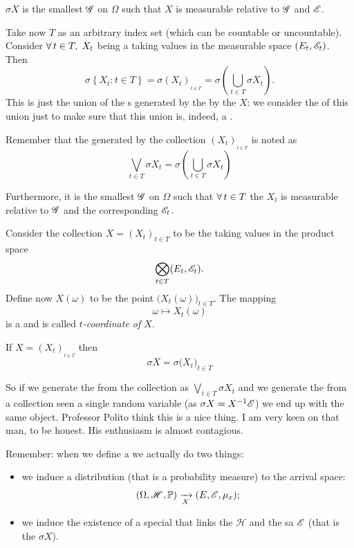 \documentclass{report}
\begin{document}
\begin{remark}
	$\sigma X$ is the smallest \sa{} $\mathscr{G}$ on $\Omega$ such that $X$ is measurable relative to $\mathscr{G}$ and $\mathscr{E}$.
\end{remark}
Take now $T$ as an arbitrary index set (which can be countable or uncountable). Consider $\forall\, t\in T,\;X_t$ being a \rv{} taking values in the measurable space $(E_t,\mathscr{E}_t)$. Then
\[
\sigma\left\{X_t:t\in T\right\}=\sigma(X_t)_{_{t\in T}}=\sigma\left(\bigcup_{t\in T}\sigma X_t\right).
\]
This is just the union of the \sa s generated by the by the \rv{} $X$: we consider the \sa{} of this union just to make sure that this union is, indeed, a \sa{}.\par
\begin{notation}
	Remember that the \sa{} generated by the collection $(X_t)_{_{t\in T}}$ is noted as
		\[\bigvee_{t\in T}\sigma X_t=\sigma\left(\bigcup_{t\in T}\sigma X_t\right)\]
\end{notation}
Furthermore, it is the smallest \sa{} $\mathscr{G}$ on $\Omega$ such that $\forall\, t\in T$ the \rv{} $X_t$ is measurable relative to $\mathscr{G}$ and the corresponding $\mathscr{E}_t$.
\begin{remark}
	Consider the collection $X={(X_{t})}_{t\in T}$ to be the \rv{} taking values in the product space 
	\[\bigotimes_{t\in T}(E_t,\mathscr{E}_t).\]
	Define now $X(\omega)$ to be the point $\Big(X_t(\omega)\Big)_{t\in T}$. The mapping 
	\[\omega\mapsto X_t(\omega)\]
	is a \rv{} and is called \emph{$t$-coordinate of $X$}.
\end{remark}
\begin{proposition}
	If $X=(X_{t})_{_{t\in T}}$ then $$\sigma X=\sigma{\Big(X_{t}\Big)}_{t\in T}$$
\end{proposition}
So if we generate the \sa{} from the collection as $\bigvee_{t\in T}\sigma X_t$ and we generate the \sa{} from a collection seen a single random variable (as $\sigma X=X^{-1}\mathscr{E}$) we end up with the same object. Professor Polito think this is a nice thing. I am very keen on that man, to be honest. His enthusiasm is almost contagious.\par
Remember: when we define a \rv{} we actually do two things:
\begin{itemize}
	\item we induce a distribution (that is a probability measure) to the arrival space:
	\[(\Omega,\mathscr{H},\mathbb{P})\xrightarrow[X]{}(E,\mathscr{E},\mu_x);\]
	\item we induce the existence of a special \sa{} that links the \sa{} $\mathscr{H}$ and the sa $\mathscr{E}$ (that is the \sa{} $\sigma X$).
\end{itemize}
\end{document}
